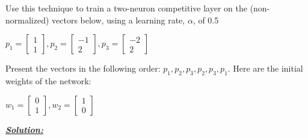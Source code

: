 \documentclass{article}
\begin{document}
\noindent Use this technique to train a two-neuron competitive layer on the (non-normalized) 
vectors below, using a learning rate, $\alpha$, of 0.5 

\begin{center}
    $p_1 = \begin{bmatrix}
        1\\
        1
      \end{bmatrix}, p_2 = \begin{bmatrix}
        -1\\
        2
      \end{bmatrix}, p_3 = \begin{bmatrix}
        -2 \\
        2
      \end{bmatrix}$
\end{center}

\noindent Present the vectors in the following order: $p_1, p_2, p_3, p_2, p_3, p_1$. 
Here are the initial weights of the network: 

\begin{center}
    $w_1 = \begin{bmatrix}
        0\\
        1
      \end{bmatrix}, w_2 = \begin{bmatrix}
        1\\
        0
      \end{bmatrix}$
      \vspace{1cm}
\end{center}

\noindent \underline{\textbf{\textit{Solution:}}}
\end{document}
